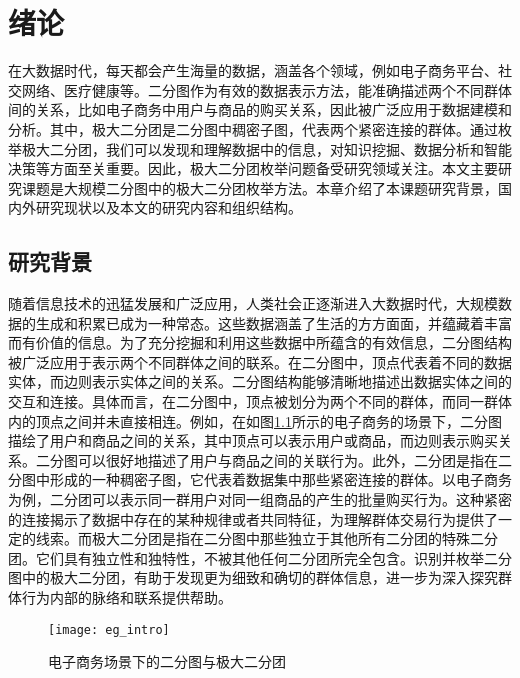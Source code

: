 \chapter{绪论}

在大数据时代，每天都会产生海量的数据，涵盖各个领域，例如电子商务平台、社交网络、医疗健康等。二分图作为有效的数据表示方法，能准确描述两个不同群体间的关系，比如电子商务中用户与商品的购买关系，因此被广泛应用于数据建模和分析。其中，极大二分团是二分图中稠密子图，代表两个紧密连接的群体。通过枚举极大二分团，我们可以发现和理解数据中的信息，对知识挖掘、数据分析和智能决策等方面至关重要。因此，极大二分团枚举问题备受研究领域关注。本文主要研究课题是大规模二分图中的极大二分团枚举方法。本章介绍了本课题研究背景，国内外研究现状以及本文的研究内容和组织结构。

\section{研究背景}

随着信息技术的迅猛发展和广泛应用，人类社会正逐渐进入大数据时代，大规模数据的生成和积累已成为一种常态。这些数据涵盖了生活的方方面面，并蕴藏着丰富而有价值的信息。为了充分挖掘和利用这些数据中所蕴含的有效信息，二分图结构被广泛应用于表示两个不同群体之间的联系。在二分图中，顶点代表着不同的数据实体，而边则表示实体之间的关系。二分图结构能够清晰地描述出数据实体之间的交互和连接。具体而言，在二分图中，顶点被划分为两个不同的群体，而同一群体内的顶点之间并未直接相连。例如，在如图\ref{fig:eg_intro}所示的电子商务的场景下，二分图描绘了用户和商品之间的关系，其中顶点可以表示用户或商品，而边则表示购买关系。二分图可以很好地描述了用户与商品之间的关联行为。此外，二分团是指在二分图中形成的一种稠密子图，它代表着数据集中那些紧密连接的群体。以电子商务为例，二分团可以表示同一群用户对同一组商品的产生的批量购买行为。这种紧密的连接揭示了数据中存在的某种规律或者共同特征，为理解群体交易行为提供了一定的线索。而极大二分团是指在二分图中那些独立于其他所有二分团的特殊二分团。它们具有独立性和独特性，不被其他任何二分团所完全包含。识别并枚举二分图中的极大二分团，有助于发现更为细致和确切的群体信息，进一步为深入探究群体行为内部的脉络和联系提供帮助。

\begin{figure} [h]
  \centering
  \texttt{[image: eg\_intro]}
  \caption{电子商务场景下的二分图与极大二分团}
  \label{fig:eg_intro}
\end{figure}



